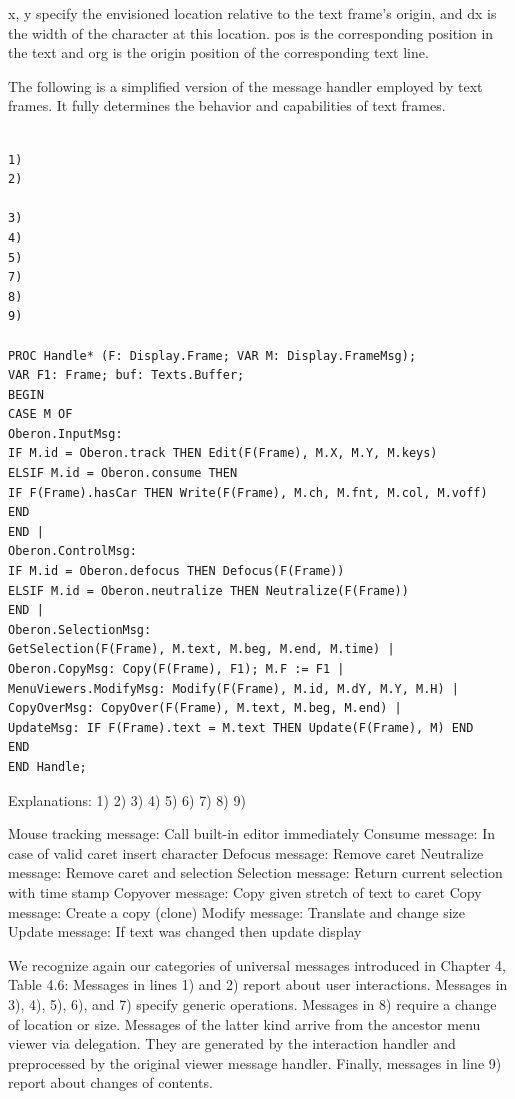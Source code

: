 x, y specify the envisioned location relative to the text frame's origin, and dx is the width of the
character at this location. pos is the corresponding position in the text and org is the origin position
of the corresponding text line.

The following is a simplified version of the message handler employed by text frames. It fully
determines the behavior and capabilities of text frames.
\begin{verbatim}

1)
2)

3)
4)
5)
7)
8)
9)

PROC Handle* (F: Display.Frame; VAR M: Display.FrameMsg);
VAR F1: Frame; buf: Texts.Buffer;
BEGIN
CASE M OF
Oberon.InputMsg:
IF M.id = Oberon.track THEN Edit(F(Frame), M.X, M.Y, M.keys)
ELSIF M.id = Oberon.consume THEN
IF F(Frame).hasCar THEN Write(F(Frame), M.ch, M.fnt, M.col, M.voff) END
END |
Oberon.ControlMsg:
IF M.id = Oberon.defocus THEN Defocus(F(Frame))
ELSIF M.id = Oberon.neutralize THEN Neutralize(F(Frame))
END |
Oberon.SelectionMsg:
GetSelection(F(Frame), M.text, M.beg, M.end, M.time) |
Oberon.CopyMsg: Copy(F(Frame), F1); M.F := F1 |
MenuViewers.ModifyMsg: Modify(F(Frame), M.id, M.dY, M.Y, M.H) |
CopyOverMsg: CopyOver(F(Frame), M.text, M.beg, M.end) |
UpdateMsg: IF F(Frame).text = M.text THEN Update(F(Frame), M) END
END
END Handle;
\end{verbatim}

Explanations:
1)
2)
3)
4)
5)
6)
7)
8)
9)

Mouse tracking message: Call built-in editor immediately
Consume message: In case of valid caret insert character
Defocus message: Remove caret
Neutralize message: Remove caret and selection
Selection message: Return current selection with time stamp
Copyover message: Copy given stretch of text to caret
Copy message: Create a copy (clone)
Modify message: Translate and change size
Update message: If text was changed then update display

We recognize again our categories of universal messages introduced in Chapter 4, Table 4.6:
Messages in lines 1) and 2) report about user interactions. Messages in 3), 4), 5), 6), and 7) specify
generic operations. Messages in 8) require a change of location or size. Messages of the latter kind
arrive from the ancestor menu viewer via delegation. They are generated by the interaction handler
and preprocessed by the original viewer message handler. Finally, messages in line 9) report about
changes of contents.

